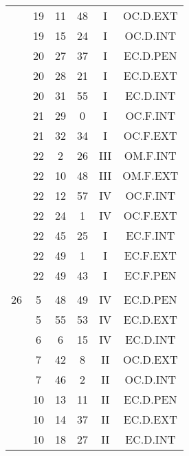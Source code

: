 \documentclass[12pt, a4paper]{article}
\begin{document}
\begin{multicols}{3}
{\begin{tabular}{c c c c c c}
	 	 	 	 & 19 & 11 & 48 & I & OC.D.EXT\\%
	 	 	 	 & 19 & 15 & 24 & I & OC.D.INT\\%
	 	 	 	 & 20 & 27 & 37 & I & EC.D.PEN\\%
	 	 	 	 & 20 & 28 & 21 & I & EC.D.EXT\\%
	 	 	 	 & 20 & 31 & 55 & I & EC.D.INT\\%
	 	 	 	 & 21 & 29 & 0 & I & OC.F.INT\\%
	 	 	 	 & 21 & 32 & 34 & I & OC.F.EXT\\%
	 	 	 	 & 22 & 2 & 26 & III & OM.F.INT\\%
	 	 	 	 & 22 & 10 & 48 & III & OM.F.EXT\\%
	 	 	 	 & 22 & 12 & 57 & IV & OC.F.INT\\%
	 	 	 	 & 22 & 24 & 1 & IV & OC.F.EXT\\%
	 	 	 	 & 22 & 45 & 25 & I & EC.F.INT\\%
	 	 	 	 & 22 & 49 & 1 & I & EC.F.EXT\\%
	 	 	 	 & 22 & 49 & 43 & I & EC.F.PEN\\%
	 	 	 	 & & & & & \\%
	 	 	 	26 & 5 & 48 & 49 & IV & EC.D.PEN\\%
	 	 	 	 & 5 & 55 & 53 & IV & EC.D.EXT\\%
	 	 	 	 & 6 & 6 & 15 & IV & EC.D.INT\\%
	 	 	 	 & 7 & 42 & 8 & II & OC.D.EXT\\%
	 	 	 	 & 7 & 46 & 2 & II & OC.D.INT\\%
	 	 	 	 & 10 & 13 & 11 & II & EC.D.PEN\\%
	 	 	 	 & 10 & 14 & 37 & II & EC.D.EXT\\%
	 	 	 	 & 10 & 18 & 27 & II & EC.D.INT\\%

\end{tabular}}
\end{multicols}
\end{document}
